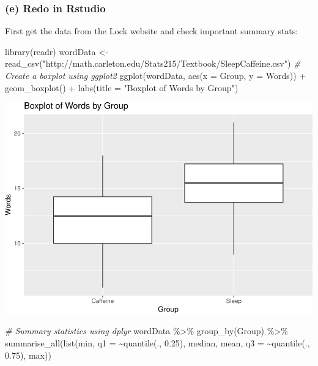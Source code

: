 \documentclass[
]{book}
\newenvironment{Shaded}{\begin{snugshade}}{\end{snugshade}}
\newcommand{\AttributeTok}[1]{\textcolor[rgb]{0.77,0.63,0.00}{#1}}
\newcommand{\CommentTok}[1]{\textcolor[rgb]{0.56,0.35,0.01}{\textit{#1}}}
\newcommand{\FloatTok}[1]{\textcolor[rgb]{0.00,0.00,0.81}{#1}}
\newcommand{\FunctionTok}[1]{\textcolor[rgb]{0.00,0.00,0.00}{#1}}
\newcommand{\NormalTok}[1]{#1}
\newcommand{\OtherTok}[1]{\textcolor[rgb]{0.56,0.35,0.01}{#1}}
\newcommand{\SpecialCharTok}[1]{\textcolor[rgb]{0.00,0.00,0.00}{#1}}
\newcommand{\StringTok}[1]{\textcolor[rgb]{0.31,0.60,0.02}{#1}}
\begin{document}
\hypertarget{e-redo-in-rstudio}{%
\subsubsection{(e) Redo in Rstudio}\label{e-redo-in-rstudio}}

First get the data from the Lock website and check important summary stats:

\begin{Shaded}
\begin{Highlighting}[]
\FunctionTok{library}\NormalTok{(readr)}
\NormalTok{wordData }\OtherTok{\textless{}{-}} \FunctionTok{read\_csv}\NormalTok{(}\StringTok{"http://math.carleton.edu/Stats215/Textbook/SleepCaffeine.csv"}\NormalTok{)}
\CommentTok{\# Create a boxplot using ggplot2}
\FunctionTok{ggplot}\NormalTok{(wordData, }\FunctionTok{aes}\NormalTok{(}\AttributeTok{x =}\NormalTok{ Group, }\AttributeTok{y =}\NormalTok{ Words)) }\SpecialCharTok{+}
  \FunctionTok{geom\_boxplot}\NormalTok{() }\SpecialCharTok{+}
  \FunctionTok{labs}\NormalTok{(}\AttributeTok{title =} \StringTok{"Boxplot of Words by Group"}\NormalTok{)}
\end{Highlighting}
\end{Shaded}

\includegraphics[width=1\linewidth]{Class_Activity_12_files/figure-latex/unnamed-chunk-1-1}

\begin{Shaded}
\begin{Highlighting}[]
\CommentTok{\# Summary statistics using dplyr}
\NormalTok{wordData }\SpecialCharTok{\%\textgreater{}\%}
  \FunctionTok{group\_by}\NormalTok{(Group) }\SpecialCharTok{\%\textgreater{}\%}
  \FunctionTok{summarise\_all}\NormalTok{(}\FunctionTok{list}\NormalTok{(min, }\AttributeTok{q1 =} \SpecialCharTok{\textasciitilde{}}\FunctionTok{quantile}\NormalTok{(., }\FloatTok{0.25}\NormalTok{), median, mean, }\AttributeTok{q3 =} \SpecialCharTok{\textasciitilde{}}\FunctionTok{quantile}\NormalTok{(., }\FloatTok{0.75}\NormalTok{), max))}
\end{Highlighting}
\end{Shaded}
\end{document}
